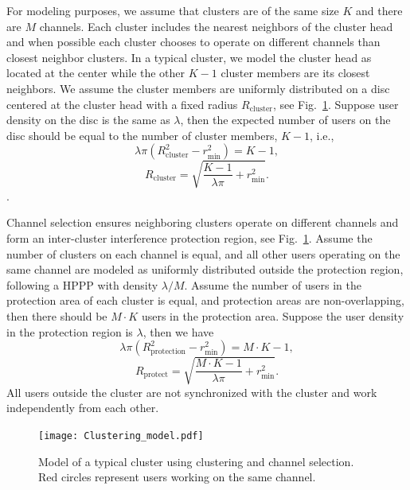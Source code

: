 \documentclass[10pt, conference, letterpaper]{IEEEtran}
\begin{document}
For modeling purposes, we assume that clusters are of the same size $K$ and there are $M$ channels. Each cluster includes the nearest neighbors of the cluster head and when possible each cluster chooses to operate on different channels than closest neighbor clusters.
In a typical cluster, we model the cluster head as located at the center while the other $K-1$ cluster members are its closest neighbors.
We assume the cluster members are uniformly distributed on a disc centered at the cluster head with a fixed radius $R_{\mathrm{cluster}}$, see Fig.~\ref{fig:clusteranalysis:model}. 
Suppose user density on the disc is the same as $\lambda$, then the expected number of users on the disc should be equal to the number of cluster members, $K - 1$, i.e., 
\begin{equation*}
\lambda \pi (R_{\mathrm{cluster}}^2 - r_{\min}^2) = K - 1,
\end{equation*}
\begin{equation*}
R_{\mathrm{cluster}} = \sqrt{\frac{K - 1}{\lambda\pi}+r_{\min}^2}.
\end{equation*}.


Channel selection ensures neighboring clusters operate on different channels and form an inter-cluster interference protection region, see Fig.~\ref{fig:clusteranalysis:model}.
Assume the number of clusters on each channel is equal, and all other users operating on the same channel are modeled as uniformly distributed outside the protection region, following a HPPP with density $\lambda/M$.
Assume the number of users in the protection area of each cluster is equal, and protection areas are non-overlapping, then there should be $M\cdot K$ users in the protection area. 
Suppose the user density in the protection region is $\lambda$, then we have 
\begin{equation*}
\lambda \pi (R_{\mathrm{protection}}^2 - r_{\min}^2) = M\cdot K - 1,
\end{equation*}
\begin{equation*}
R_{\mathrm{protect}} = \sqrt{\frac{M\cdot K - 1}{\lambda \pi} + r_{\min}^2}.
\end{equation*}
All users outside the cluster are not synchronized with the cluster and work independently from each other.  

\begin{figure}
	\centering
	\texttt{[image: Clustering\_model.pdf]}
	\caption{Model of a typical cluster using clustering and channel selection. Red circles represent users working on the same channel.}
	\label{fig:clusteranalysis:model}
\end{figure}
\end{document}
